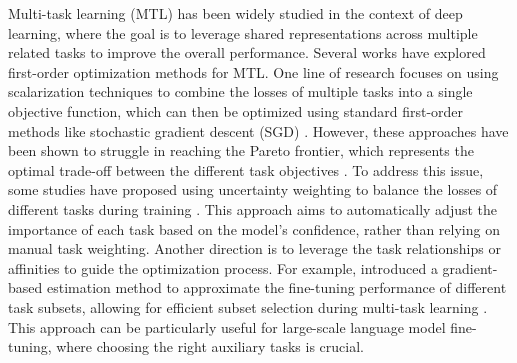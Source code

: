 Multi-task learning (MTL) has been widely studied in the context of deep learning, where the goal is to leverage shared representations across multiple related tasks to improve the overall performance. Several works have explored first-order optimization methods for MTL.
One line of research focuses on using scalarization techniques to combine the losses of multiple tasks into a single objective function, which can then be optimized using standard first-order methods like stochastic gradient descent (SGD) \citep{hu2024revisiting}. However, these approaches have been shown to struggle in reaching the Pareto frontier, which represents the optimal trade-off between the different task objectives .
To address this issue, some studies have proposed using uncertainty weighting to balance the losses of different tasks during training \citep{xin2022current}. This approach aims to automatically adjust the importance of each task based on the model's confidence, rather than relying on manual task weighting.
Another direction is to leverage the task relationships or affinities to guide the optimization process. For example, \citet{li2024scalable} introduced a gradient-based estimation method to approximate the fine-tuning performance of different task subsets, allowing for efficient subset selection during multi-task learning \citep{samant2022framework}. This approach can be particularly useful for large-scale language model fine-tuning, where choosing the right auxiliary tasks is crucial.